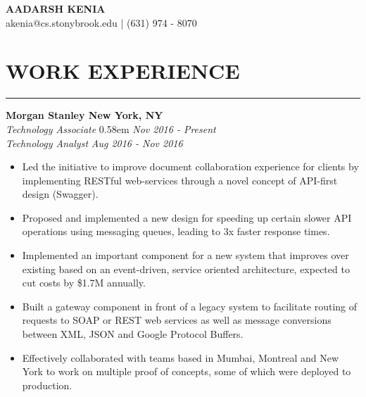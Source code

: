 \documentclass[12pt]{article}
\newcommand{\sectionHeading}[1]{
\vspace{-15pt}
\section*{\small{#1}}
\vspace{-10pt}
\hrule
\vspace{8pt}
}
\newcommand{\experienceSectionSubheading}[6]{
  \vspace{-1pt}
    \small{\textbf{Morgan Stanley \hfill New York, NY}} \\
    \small{\textit{#3} \hfill \spaceskip  0.58em  \relax\textit{#4}} \\
    \small{\textit{#5} \hfill \textit{#6}} \\
    
    \vspace{-20pt}
}
\newcommand{\sectionListStart}{
    \begin{itemize}[label={\small{\textbullet}}, leftmargin=20pt] %
}
\newcommand{\sectionListEnd}{\end{itemize} \vspace{-5pt}}
\newcommand{\sectionListItem}[1]{\item \small{#1}}
\begin{document}
\begin{center}
\LARGE{\textbf{AADARSH KENIA}}\\
\vspace{4pt}
\small{akenia@cs.stonybrook.edu} | (631) 974 - 8070 \\
\vspace{-12pt}
\end{center}

\sectionHeading{WORK EXPERIENCE}
\experienceSectionSubheading
{Morgan Stanley}{New York, NY}
{Technology Associate}{Nov 2016 - Present}
{Technology Analyst}{Aug 2016 - Nov 2016}
\sectionListStart
    \sectionListItem
        Led the initiative to improve document collaboration experience for clients by implementing RESTful web-services through a novel concept of API-first design (Swagger).
        
    \sectionListItem
        Proposed and implemented a new design for speeding up certain slower API operations using messaging queues, leading to 3x faster response times.
    
    \sectionListItem
        Implemented an important component for a new system that improves over existing based on an event-driven, service oriented architecture, expected to cut costs by \$1.7M annually.
    
    \sectionListItem
        Built a gateway component in front of a legacy system to facilitate routing of requests to SOAP or REST web services as well as message conversions between XML, JSON and Google Protocol Buffers.
    
    \sectionListItem    
        Effectively collaborated with teams based in Mumbai, Montreal and New York to work on multiple proof of concepts, some of which were deployed to production. 
        
     
    
        
\sectionListEnd
\end{document}
